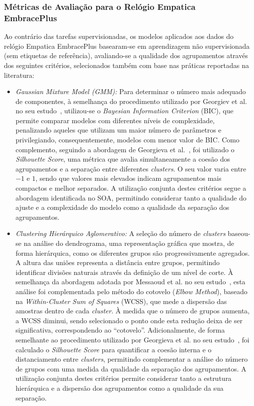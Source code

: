 \subsubsection*{Métricas de Avaliação para o Relógio Empatica EmbracePlus}

Ao contrário das tarefas supervisionadas, os modelos aplicados aos dados do relógio Empatica EmbracePlus basearam-se em aprendizagem não supervisionada (sem etiquetas de referência), avaliando-se a qualidade dos agrupamentos através dos seguintes critérios, selecionados também com base nas práticas reportadas na literatura:

\begin{itemize}

\item \textit{Gaussian Mixture Model (GMM):} Para determinar o número mais adequado de componentes, à semelhança do procedimento utilizado por Georgiev et al. no seu estudo~\cite{georgiev2026}, utilizou-se o \textit{Bayesian Information Criterion} (BIC), que permite comparar modelos com diferentes níveis de complexidade, penalizando aqueles que utilizam um maior número de parâmetros e privilegiando, consequentemente, modelos com menor valor de BIC. Como complemento, seguindo a abordagem de Georgieva et al.~\cite{georgieva2025}, foi utilizado o \textit{Silhouette Score}, uma métrica que avalia simultaneamente a coesão dos agrupamentos e a separação entre diferentes \textit{clusters}. O seu valor varia entre $-1$ e $1$, sendo que valores mais elevados indicam agrupamentos mais compactos e melhor separados. A utilização conjunta destes critérios segue a abordagem identificada no SOA, permitindo considerar tanto a qualidade do ajuste e a complexidade do modelo como a qualidade da separação dos agrupamentos.

\item \textit{Clustering Hierárquico Aglomerativo:} A seleção do número de \textit{clusters} baseou-se na análise do dendrograma, uma representação gráfica que mostra, de forma hierárquica, como os diferentes grupos são progressivamente agregados. A altura das uniões representa a distância entre grupos, permitindo identificar divisões naturais através da definição de um nível de corte. À semelhança da abordagem adotada por Messaoud et al. no seu estudo~\cite{messaoud2025}, esta análise foi complementada pelo método do cotovelo (\textit{Elbow Method}), baseado na \textit{Within-Cluster Sum of Squares} (WCSS), que mede a dispersão das amostras dentro de cada \textit{cluster}. À medida que o número de grupos aumenta, a WCSS diminui, sendo selecionado o ponto onde esta redução deixa de ser significativa, correspondendo ao ``cotovelo''. Adicionalmente, de forma semelhante ao procedimento utilizado por Georgieva et al. no seu estudo~\cite{georgieva2025}, foi calculado o \textit{Silhouette Score} para quantificar a coesão interna e o distanciamento entre \textit{clusters}, permitindo complementar a análise do número de grupos com uma medida da qualidade da separação dos agrupamentos. A utilização conjunta destes critérios permite considerar tanto a estrutura hierárquica e a dispersão dos agrupamentos como a qualidade da sua separação.


\end{itemize}
